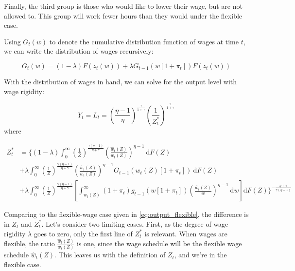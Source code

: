 \documentclass[12pt,a4paper]{scrartcl}            %
\begin{document}
Finally, the third group is those who would like to lower their wage, but are not allowed to.
This group will work fewer hours than they would under the flexible case.

Using $G_t(w)$ to denote the cumulative distribution function of wages at time $t$, we can write the distribution of wages recursively:

\begin{equation}
    \label{eq:wage_distribution}
    G_t(w) = (1 - \lambda) F(z_t(w)) + \lambda G_{t-1}\left(w[1 + \pi_t]\right)F(z_t(w))
\end{equation}

With the distribution of wages in hand, we can solve for the output level with wage rigidity:

\begin{equation}
    \label{eq:output_rigid}
    Y_t = L_t = \left(\frac{\eta - 1}{\eta} \right)^{\frac{\gamma}{1 + \gamma}}\left( \frac{1}{Z_t^*} \right)^{\frac{\gamma}{1 + \gamma}}
\end{equation}
%
where

\begin{equation}
    \label{eq:z_star}
    \begin{split}
    Z_t^* &= \Big\{(1 - \lambda) \int_{0}^{\infty} \! \left( \frac{1}{Z} \right)^{\frac{\gamma(\eta - 1)}{\eta + \gamma}} \left( \frac{\hat{w}_t(Z)}{w_t(Z)} \right)^{\eta - 1}\ \mathrm{d}F(Z) \\
          &+            \lambda  \int_{0}^{\infty} \! \left( \frac{1}{Z} \right)^{\frac{\gamma(\eta - 1)}{\eta + \gamma}} \left( \frac{\hat{w}_t(Z)}{w_t(Z)} \right)^{\eta - 1} G_{t-1}\left( w_t(Z)[1 + \pi_t] \right)                                                     \ \mathrm{d}F(Z)\\
          &+            \lambda  \int_{0}^{\infty} \! \left( \frac{1}{Z} \right)^{\frac{\gamma(\eta - 1)}{\eta + \gamma}} \left[ \int_{w_t(Z)}^{\infty} (1 + \pi_t)g_{t-1}\left( w[1 + \pi_t] \right) \left( \frac{\hat{w}_t(Z)}{w} \right)^{\eta - 1}\ \mathrm{d}w \right] \mathrm{d}F(Z)
            \Big\}^{-\frac{\eta + \gamma}{\gamma(\eta - 1)}}
    \end{split}
\end{equation}

Comparing to the flexible-wage case given in \eqref{eq:output_flexible}, the difference is in $Z_t$ and $Z_t^*$.
Let's consider two limiting cases.
First, as the degree of wage rigidity $\lambda$ goes to zero, only the first line of $Z_t^*$ is relevant.
When wages are flexible, the ratio $\frac{\hat{w}_t(Z)}{w_t(Z)}$ is one, since the wage schedule will be the flexible wage schedule $\hat{w}_t(Z)$.  %
This leaves us with the definition of $Z_t$, and we're in the flexible case.
\end{document}

